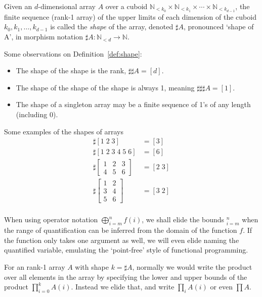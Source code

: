 \documentclass{DIKU-report-variant}
\newcommand\Nat{\mathbb{N}}
\begin{document}
\begin{definition}
  \label{def:shape}
  Given an \(d\)-dimensional array \(A\) over a cuboid
  \(\Nat_{<k_0} \times \Nat_{<k_1} \times \cdots \times \Nat_{<k_{d-1}}\),
  the finite sequence (rank-1 array) of the upper limits of each dimension of the cuboid
  \(k_0, k_1, \dots, k_{d-1}\) is called the \emph{shape} of the array, denoted
  \(\sharp A\), pronounced `shape of A', in morphism notation \(\sharp A : \Nat_{<d} \to \Nat\). 
\end{definition}
\begin{observation}
  \label{ob:shape}
  Some observations on Definition~\ref{def:shape}:
  \begin{itemize}
    \item The shape of the shape is the rank, \(\sharp \sharp A = [d]\).
    \item The shape of the shape of the shape is always 1, meaning \(\sharp \sharp \sharp A = [1]\).
    \item The shape of a singleton array may be a finite sequence of 1's of any length (including 0).
  \end{itemize}
\end{observation}

\begin{example}
  Some examples of the shapes of arrays
  \begin{align*}
    \sharp [1\; 2\; 3] &= [3] \\
    \sharp [1\; 2\; 3\; 4\; 5\; 6] &= [6] \\
    \sharp \begin{bmatrix}
      1 & 2 & 3 \\ 4 & 5 & 6
    \end{bmatrix} &= [2\; 3] \\
    \sharp \begin{bmatrix}
      1 & 2 \\ 3 & 4 \\ 5 & 6
    \end{bmatrix} &= [3\; 2] \\
  \end{align*}
\end{example}

\begin{remark}
  \label{rem:quant-elision}
  When using operator notation \(\bigoplus_{i=m}^n f(i)\),
  we shall elide the bounds \({}_{i=m}^n\) when the range of quantification can
  be inferred from the domain of the function \(f\). If the function only
  takes one argument as well, we will even elide naming the quantified variable,
  emulating the `point-free' style of functional programming.

  For an rank-1 array \(A\) with shape \(k = \sharp A\), normally we would
  write the product over all elements in the array by specifying the lower
  and upper bounds of the product \(\prod_{i=0}^{k} A(i)\). Instead we elide
  that, and write \(\prod_i A(i)\) or even \(\prod A\).
\end{remark}
\end{document}
